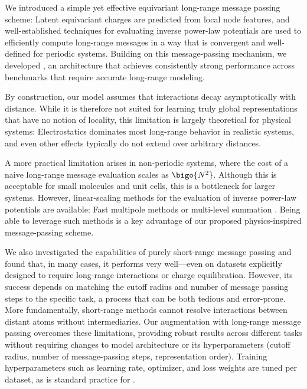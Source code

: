 \documentclass[10pt]{article}
\begin{document}
We introduced a simple yet effective equivariant long-range message passing scheme: Latent equivariant charges are predicted from local node features, and well-established techniques for evaluating inverse power-law potentials are used to efficiently compute long-range messages in a way that is convergent and well-defined for periodic systems. Building on this message-passing mechanism, we developed \lorem, an \mlp architecture that achieves consistently strong performance across benchmarks that require accurate long-range modeling.

By construction, our model assumes that interactions decay asymptotically with distance. While it is therefore not suited for learning truly global representations that have no notion of locality, this limitation is largely theoretical for physical systems: Electrostatics dominates most long-range behavior in realistic systems, and even other effects typically do not extend over arbitrary distances.

A more practical limitation arises in non-periodic systems, where the cost of a naive long-range message evaluation scales as $\bigo{N^2}$. Although this is acceptable for small molecules and unit cells, this is a bottleneck for larger systems. However, linear-scaling methods for the evaluation of inverse power-law potentials are available: Fast multipole methods \citep{gr1987,pybbfmm} or multi-level summation \citep{hwpsss2015,bsucm2025pre}. Being able to leverage such methods is a key advantage of our proposed physics-inspired message-passing scheme.

We also investigated the capabilities of purely short-range message passing and found that, in many cases, it performs very well—even on datasets explicitly designed to require long-range interactions or charge equilibration. However, its success depends on matching the cutoff radius and number of message passing steps to the specific task, a process that can be both tedious and error-prone. More fundamentally, short-range methods cannot resolve interactions between distant atoms without intermediaries.
Our augmentation with long-range message passing overcomes these limitations, providing robust results across different tasks without requiring changes to model architecture or its hyperparameters (cutoff radius, number of message-passing steps, representation order). Training hyperparameters such as learning rate, optimizer, and loss weights are tuned per dataset, as is standard practice for \mlps.
\end{document}
